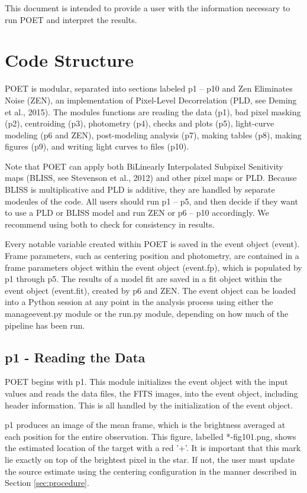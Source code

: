 \documentclass[letterpaper,12pt]{article}
\begin{document}
This document is intended to provide a user with the information necessary
to run POET and interpret the results.

\section{Code Structure}
\label{sec:structure}
POET is modular, separated into sections labeled p1 -- p10 and Zen
Eliminates Noise (ZEN), an implementation of Pixel-Level Decorrelation
(PLD, see Deming et al., 2015).  The modules functions are reading the
data (p1), bad pixel masking (p2), centroiding (p3), photometry (p4),
checks and plots (p5), light-curve modeling (p6 and ZEN),
post-modeling analysis (p7), making tables (p8), making figures (p9),
and writing light curves to files (p10).

Note that POET can apply both BiLinearly Interpolated Subpixel
Senitivity maps (BLISS, see Stevenson et al., 2012) and other pixel
maps or PLD. Because BLISS is multiplicative and PLD is additive, they
are handled by separate modeules of the code. All users should run p1
-- p5, and then decide if they want to use a PLD or BLISS model and
run ZEN or p6 -- p10 accordingly. We recommend using both to check for
consistency in results.

Every notable variable created within POET is saved in the event
object (event). Frame parameters, such as centering position and
photometry, are contained in a frame parameters object within the
event object (event.fp), which is populated by p1 through p5.  The
results of a model fit are saved in a fit object within the event
object (event.fit), created by p6 and ZEN. The event object can be
loaded into a Python session at any point in the analysis process
using either the manageevent.py module or the run.py module, depending
on how much of the pipeline has been run.

\subsection{p1 - Reading the Data}
\label{sec:p1}
POET begins with p1. This module initializes the event object with
the input values and reads the data files, the FITS images, into
the event object, including header information. This is all handled
by the initialization of the event object.

p1 produces an image of the mean frame, which is the brightness
averaged at each position for the entire observation. This figure,
labelled *-fig101.png, shows the estimated location of the target with
a red '+'. It is important that this mark lie exactly on top of the
brightest pixel in the star. If not, the user must update the source
estimate using the centering configuration in the manner described in
Section \ref{sec:procedure}.
\end{document}

